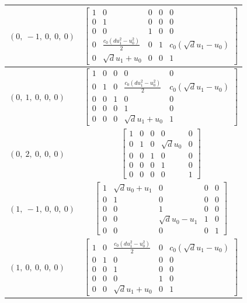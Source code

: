 \documentclass[11pt]{article}
\theoremstyle{definition}
\begin{document}
\begin{tabular}{|l|c|}
    \hline
    $\left( 0, \  -1, \  0, \  0, \  0\right)$ & $\left[\begin{matrix}1 & 0 & 0 & 0 & 0\\0 & 1 & 0 & 0 & 0\\0 & 0 & 1 & 0 & 0\\0 & \frac{c_{0} \left(d u_{1}^{2} - u_{0}^{2}\right)}{2} & 0 & 1 & c_{0} \left(\sqrt{d} u_{1} - u_{0}\right)\\0 & \sqrt{d} u_{1} + u_{0} & 0 & 0 & 1\end{matrix}\right]$ \\
    \hline
    $\left( 0, \  1, \  0, \  0, \  0\right)$ & $\left[\begin{matrix}1 & 0 & 0 & 0 & 0\\0 & 1 & 0 & \frac{c_{0} \left(d u_{1}^{2} - u_{0}^{2}\right)}{2} & c_{0} \left(\sqrt{d} u_{1} - u_{0}\right)\\0 & 0 & 1 & 0 & 0\\0 & 0 & 0 & 1 & 0\\0 & 0 & 0 & \sqrt{d} u_{1} + u_{0} & 1\end{matrix}\right]$ \\
    \hline
    $\left( 0, \  2, \  0, \  0, \  0\right)$ & $\left[\begin{matrix}1 & 0 & 0 & 0 & 0\\0 & 1 & 0 & \sqrt{d} u_{0} & 0\\0 & 0 & 1 & 0 & 0\\0 & 0 & 0 & 1 & 0\\0 & 0 & 0 & 0 & 1\end{matrix}\right]$ \\
    \hline
    $\left( 1, \  -1, \  0, \  0, \  0\right)$ & $\left[\begin{matrix}1 & \sqrt{d} u_{0} + u_{1} & 0 & 0 & 0\\0 & 1 & 0 & 0 & 0\\0 & 0 & 1 & 0 & 0\\0 & 0 & \sqrt{d} u_{0} - u_{1} & 1 & 0\\0 & 0 & 0 & 0 & 1\end{matrix}\right]$ \\
    \hline
    $\left( 1, \  0, \  0, \  0, \  0\right)$ & $\left[\begin{matrix}1 & 0 & \frac{c_{0} \left(d u_{1}^{2} - u_{0}^{2}\right)}{2} & 0 & c_{0} \left(\sqrt{d} u_{1} - u_{0}\right)\\0 & 1 & 0 & 0 & 0\\0 & 0 & 1 & 0 & 0\\0 & 0 & 0 & 1 & 0\\0 & 0 & \sqrt{d} u_{1} + u_{0} & 0 & 1\end{matrix}\right]$ \\

\end{tabular}
\end{document}
